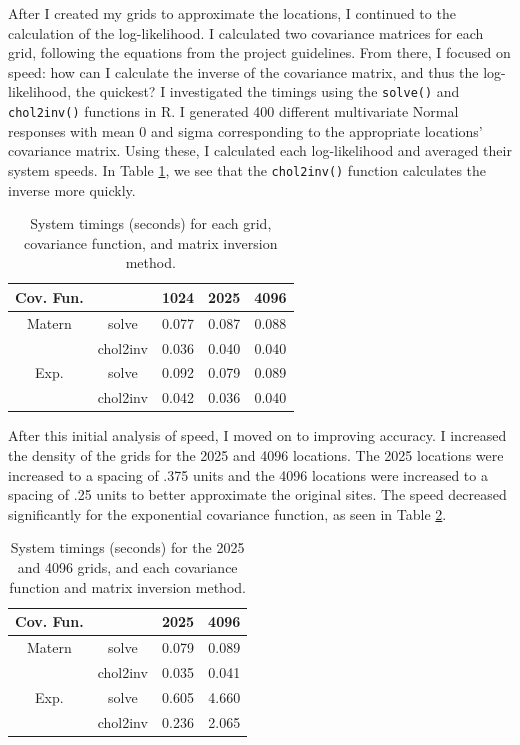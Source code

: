 \documentclass[11pt]{article}
\begin{document}
\begin{flushleft}
	After I created my grids to approximate the locations, I continued to the calculation of the log-likelihood. I calculated two covariance matrices for each grid, following the equations from the project guidelines. From there, I focused on speed: how can I calculate the inverse of the covariance matrix, and thus the log-likelihood, the quickest? I investigated the timings using the \verb|solve()| and \verb|chol2inv()| functions in R. I generated 400 different multivariate Normal responses with mean 0 and sigma corresponding to the appropriate locations' covariance matrix. Using these, I calculated each log-likelihood and averaged their system speeds. In Table \ref{t:max}, we see that the \verb|chol2inv()| function calculates the inverse more quickly.
\end{flushleft}

\begin{table}[h]\caption{System timings (seconds) for each grid, covariance function, and matrix inversion method.}\label{t:max}	
	\begin{center}\begin{tabular}{ c || c || c c c  }
			Cov. Fun. & & 1024 & 2025 & 4096\\
			\hline
			Matern & solve & 0.077 & 0.087 & 0.088\\ & chol2inv & 0.036 & 0.040 & 0.040\\
			\hline
			Exp. & solve & 0.092 & 0.079 & 0.089\\ & chol2inv & 0.042 & 0.036 & 0.040\\ 
		\end{tabular}\end{center}\end{table}

\begin{flushleft}
	After this initial analysis of speed, I moved on to improving accuracy. I increased the density of the grids for the 2025 and 4096 locations. The 2025 locations were increased to a spacing of .375 units and the 4096 locations were increased to a spacing of .25 units to better approximate the original sites. The speed decreased significantly for the exponential covariance function, as seen in Table \ref{t:min}.
\end{flushleft}

\begin{table}[h]\caption{System timings (seconds) for the 2025 and 4096 grids, and each covariance function and matrix inversion method.}\label{t:min}	
	\begin{center}\begin{tabular}{ c || c || c c  }
			Cov. Fun. & & 2025 & 4096\\
			\hline
			Matern & solve & 0.079 & 0.089\\ & chol2inv & 0.035 & 0.041\\
			\hline
			Exp. & solve & 0.605 & 4.660\\ & chol2inv & 0.236 & 2.065\\ 
		\end{tabular}\end{center}\end{table}
		
\end{document}
